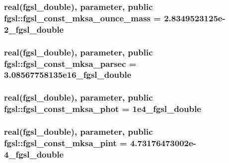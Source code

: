 \hypertarget{classfgsl_ad41b90538ca94b0ba552ed733d732c4b}{
\subsubsection[{fgsl\-\_\-const\-\_\-mksa\-\_\-ounce\-\_\-mass}]{\setlength{\rightskip}{0pt plus 5cm}real({\bf fgsl\-\_\-double}), parameter, public fgsl\-::fgsl\-\_\-const\-\_\-mksa\-\_\-ounce\-\_\-mass = 2.\-8349523125e-\/2\-\_\-fgsl\-\_\-double}}\label{classfgsl_ad41b90538ca94b0ba552ed733d732c4b}
\hypertarget{classfgsl_ab701318a50ffa3b0b31f26f7882a2b16}{
\subsubsection[{fgsl\-\_\-const\-\_\-mksa\-\_\-parsec}]{\setlength{\rightskip}{0pt plus 5cm}real({\bf fgsl\-\_\-double}), parameter, public fgsl\-::fgsl\-\_\-const\-\_\-mksa\-\_\-parsec = 3.\-08567758135e16\-\_\-fgsl\-\_\-double}}\label{classfgsl_ab701318a50ffa3b0b31f26f7882a2b16}
\hypertarget{classfgsl_aa7384fc174d5954073075ac6e8117789}{
\subsubsection[{fgsl\-\_\-const\-\_\-mksa\-\_\-phot}]{\setlength{\rightskip}{0pt plus 5cm}real({\bf fgsl\-\_\-double}), parameter, public fgsl\-::fgsl\-\_\-const\-\_\-mksa\-\_\-phot = 1e4\-\_\-fgsl\-\_\-double}}\label{classfgsl_aa7384fc174d5954073075ac6e8117789}
\hypertarget{classfgsl_a11b62fc3ced19e2c4f1ad227de09f9f0}{
\subsubsection[{fgsl\-\_\-const\-\_\-mksa\-\_\-pint}]{\setlength{\rightskip}{0pt plus 5cm}real({\bf fgsl\-\_\-double}), parameter, public fgsl\-::fgsl\-\_\-const\-\_\-mksa\-\_\-pint = 4.\-73176473002e-\/4\-\_\-fgsl\-\_\-double}}\label{classfgsl_a11b62fc3ced19e2c4f1ad227de09f9f0}
